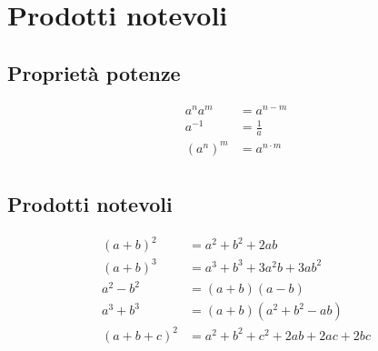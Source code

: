 \newpage
\section{Prodotti notevoli}

\subsection{Proprietà potenze}
\begin{align*}
	a^{n}a^{m}             & = a^{n-m}        \\[12pt]
	a^{-1}                 & = \frac{1}{a}    \\[12pt]
	\left(a^{n}\right)^{m} & = a^{n \cdot  m} \\[12pt]
\end{align*}
\subsection{Prodotti notevoli}\label{prodnotevoli}
\begin{align*}
	\left(a + b\right)^2 & = a^2  + b ^2  +2ab                           \\[12pt]
	\left(a + b\right)^3 & = a^3  + b^3 +3a^2 b + 3 a b^2                \\[12pt]
	a^2  - b^2           & = \left(a+b\right)\left(a-b\right)            \\[12pt]
	a^3 + b^3            & = \left(a + b\right)\left(a^2 +b^2 -ab\right) \\[12pt]
	\left(a+b+c\right)^2 & = a^2  + b^2  + c^2 +2ab + 2ac + 2bc
\end{align*}
